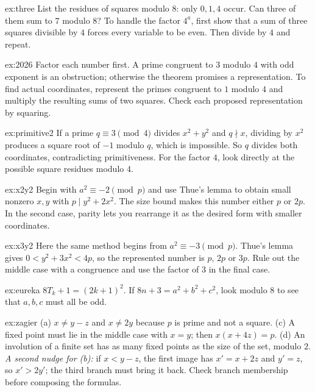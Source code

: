 \begin{hint}{ex:three}
List the residues of squares modulo $8$: only $0,1,4$ occur. Can three of them sum to $7$ modulo $8$? To handle the factor $4^a$, first show that a sum of three squares divisible by $4$ forces every variable to be even. Then divide by $4$ and repeat.
\end{hint}
\begin{hint}{ex:2026}
Factor each number first. A prime congruent to $3$ modulo $4$ with odd exponent is an obstruction; otherwise the theorem promises a representation. To find actual coordinates, represent the primes congruent to $1$ modulo $4$ and multiply the resulting sums of two squares. Check each proposed representation by squaring.
\end{hint}
\begin{hint}{ex:primitive2}
If a prime $q\equiv3\pmod4$ divides $x^2+y^2$ and $q\nmid x$, dividing by $x^2$ produces a square root of $-1$ modulo $q$, which is impossible. So $q$ divides both coordinates, contradicting primitiveness. For the factor $4$, look directly at the possible square residues modulo $4$.
\end{hint}
\begin{hint}{ex:x2y2}
Begin with $a^2\equiv-2\pmod p$ and use Thue's lemma to obtain small nonzero $x,y$ with $p\mid y^2+2x^2$. The size bound makes this number either $p$ or $2p$. In the second case, parity lets you rearrange it as the desired form with smaller coordinates.
\end{hint}
\begin{hint}{ex:x3y2}
Here the same method begins from $a^2\equiv-3\pmod p$. Thue's lemma gives $0<y^2+3x^2<4p$, so the represented number is $p$, $2p$ or $3p$. Rule out the middle case with a congruence and use the factor of $3$ in the final case.
\end{hint}
\begin{hint}{ex:eureka}
$8T_k+1=(2k+1)^2$. If $8n+3=a^2+b^2+c^2$, look modulo $8$ to see that $a,b,c$ must all be odd.
\end{hint}
\begin{hint}{ex:zagier}
(a) $x\ne y-z$ and $x\ne2y$ because $p$ is prime and not a square. (c) A fixed point must lie in the middle case with $x=y$; then $x(x+4z)=p$. (d) An involution of a finite set has as many fixed points as the size of the set, modulo $2$. \emph{A second nudge for (b):} if $x<y-z$, the first image has $x'=x+2z$ and $y'=z$, so $x'>2y'$; the third branch must bring it back. Check branch membership before composing the formulas.
\end{hint}

